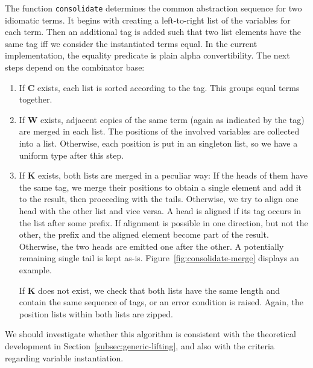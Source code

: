 The function \texttt{consolidate} determines the common abstraction sequence
for two idiomatic terms.
It begins with creating a left-to-right list of the variables for each term.
Then an additional tag is added such that two list elements have the same
tag iff we consider the instantiated terms equal.
In the current implementation, the equality predicate is plain alpha
convertibility.
The next steps depend on the combinator base:
\begin{enumerate}
\item If $\mathbf{C}$ exists, each list is sorted according to the tag.
	This groups equal terms together.
\item If $\mathbf{W}$ exists, adjacent copies of the same term (again as
	indicated by the tag) are merged in each list.
	The positions of the involved variables are collected into a list.
	Otherwise, each position is put in an singleton list, so we have a uniform
	type after this step.
\item If $\mathbf{K}$ exists, both lists are merged in a peculiar way:
	If the heads of them have the same tag, we merge their positions to obtain
	a single element and add it to the result, then proceeding with the tails.
	Otherwise, we try to align one head with the other list and vice versa.
	A head is aligned if its tag occurs in the list after some prefix.
	If alignment is possible in one direction, but not the other, the prefix
	and the aligned element become part of the result.
	Otherwise, the two heads are emitted one after the other.
	A potentially remaining single tail is kept as-is.
	Figure~\ref{fig:consolidate-merge} displays an example.

	If $\mathbf{K}$ does not exist, we check that both lists have the same
	length and contain the same sequence of tags, or an error condition is raised.
	Again, the position lists within both lists are zipped.
\end{enumerate}
We should investigate whether this algorithm is consistent with the theoretical
development in Section~\ref{subsec:generic-lifting}, and also with the
criteria regarding variable instantiation.
